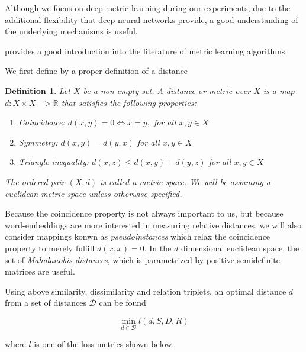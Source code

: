 \documentclass[a4paper,12pt,twoside,openright]{report}
\begin{document}
Although we focus on deep metric learning during our experiments, due to the additional flexibility that deep neural networks provide, a good understanding of the underlying mechanisms is useful.

\cite{suarez19} provides a good introduction into the literature of metric learning algorithms.

We first define by a proper definition of a distance

\newtheorem{mydef}{Definition}
\begin{mydef}
Let $X$ be a non empty set. A \textit{distance} or \textit{metric} over $X$ is a map $d: X \times X -> \mathbb{R}$ that satisfies the following properties:

\begin{enumerate}
\item Coincidence: $d(x, y) = 0 \iff x = y,$ for all $x, y \in X$
\item Symmetry: $d(x, y) = d(y, x)$ for all $x, y \in X$
\item Triangle inequality: $d(x, z) \leq d(x, y) + d(y, z) $ for all $x, y \in X$
\end{enumerate}
The ordered pair $(X, d)$ is called a metric space. 
We will be assuming a euclidean metric space unless otherwise specified.
\end{mydef}

Because the coincidence property is not always important to us, but because word-embeddings are more interested in measuring relative distances, we will also consider mappings konwn as \textit{pseudoinstances} which relax the coincidence property to merely fulfill $d(x, x) = 0$.
In the $d$ dimensional euclidean space, the set of \textit{Mahalanobis distances}, which is parametrized by positive semidefinite matrices are useful.

Using above similarity, dissimilarity and relation triplets, an optimal distance $d$ from a set of distances $\mathcal{D}$ can be found

\begin{equation}
\min_{d \in \mathcal{D}} l (d, S, D, R)
\end{equation}

where $l$ is one of the loss metrics shown below.
\end{document}
